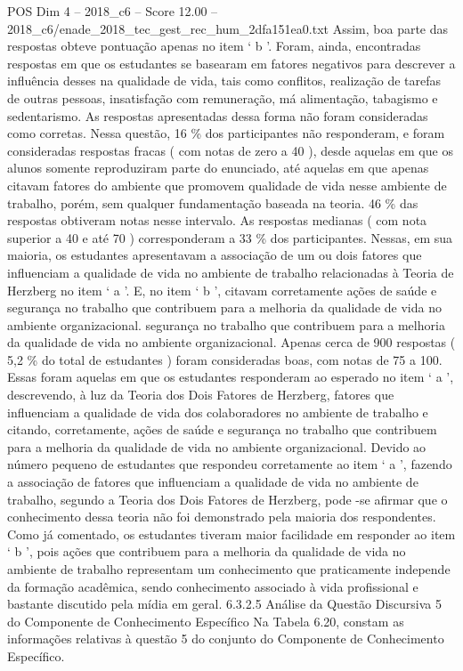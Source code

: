 \begin{textsample}{POS Dim 4 – 2018\_c6 – Score 12.00 – 2018\_c6/enade\_2018\_tec\_gest\_rec\_hum\_2dfa151ea0.txt}
Assim, boa parte das respostas obteve pontuação apenas no item ‘ b ’.
Foram, ainda, encontradas respostas em que os estudantes se basearam em fatores negativos para descrever a influência desses na qualidade de vida, tais como conflitos, realização de tarefas de outras pessoas, insatisfação com remuneração, má alimentação, tabagismo e sedentarismo.
As respostas apresentadas dessa forma não foram consideradas como corretas.
Nessa questão, 16 \% dos participantes não responderam, e foram consideradas respostas fracas ( com notas de zero a 40 ), desde aquelas em que os alunos somente reproduziram parte do enunciado, até aquelas em que apenas citavam fatores do ambiente que promovem qualidade de vida nesse ambiente de trabalho, porém, sem qualquer fundamentação baseada na teoria. 46 \% das respostas obtiveram notas nesse intervalo.
As respostas medianas ( com nota superior a 40 e até 70 ) corresponderam a 33 \% dos participantes.
Nessas, em sua maioria, os estudantes apresentavam a associação de um ou dois fatores que influenciam a qualidade de vida no ambiente de trabalho relacionadas à Teoria de Herzberg no item ‘ a ’.
E, no item ‘ b ’, citavam corretamente ações de saúde e segurança no trabalho que contribuem para a melhoria da qualidade de vida no ambiente organizacional. segurança no trabalho que contribuem para a melhoria da qualidade de vida no ambiente organizacional.
Apenas cerca de 900 respostas ( 5,2 \% do total de estudantes ) foram consideradas boas, com notas de 75 a 100.
Essas foram aquelas em que os estudantes responderam ao esperado no item ‘ a ’, descrevendo, à luz da Teoria dos Dois Fatores de Herzberg, fatores que influenciam a qualidade de vida dos colaboradores no ambiente de trabalho e citando, corretamente, ações de saúde e segurança no trabalho que contribuem para a melhoria da qualidade de vida no ambiente organizacional.
Devido ao número pequeno de estudantes que respondeu corretamente ao item ‘ a ’, fazendo a associação de fatores que influenciam a qualidade de vida no ambiente de trabalho, segundo a Teoria dos Dois Fatores de Herzberg, pode -se afirmar que o conhecimento dessa teoria não foi demonstrado pela maioria dos respondentes.
Como já comentado, os estudantes tiveram maior facilidade em responder ao item ‘ b ’, pois ações que contribuem para a melhoria da qualidade de vida no ambiente de trabalho representam um conhecimento que praticamente independe da formação acadêmica, sendo conhecimento associado à vida profissional e bastante discutido pela mídia em geral. 6.3.2.5 Análise da Questão Discursiva 5 do Componente de Conhecimento Específico Na Tabela 6.20, constam as informações relativas à questão 5 do conjunto do Componente de Conhecimento Específico.

\end{textsample}
